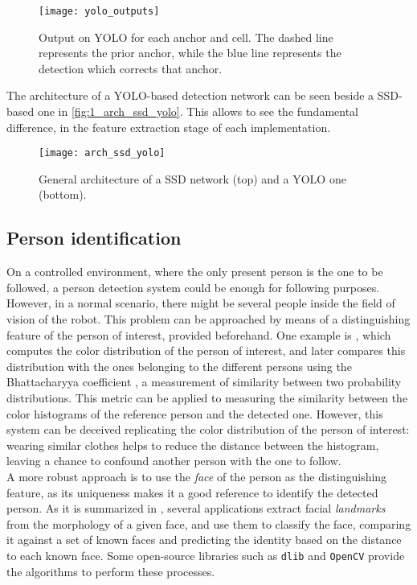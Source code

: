 \begin{figure}[h]
	\centering
	\texttt{[image: yolo\_outputs]}
	\caption{Output on YOLO for each anchor and cell. The dashed line represents the prior anchor, while the blue line represents the detection which corrects that anchor.}
	\label{fig:1_yolo_output}
\end{figure}


The architecture of a YOLO-based detection network can be seen beside a SSD-based one in \autoref{fig:1_arch_ssd_yolo}. This allows to see the fundamental difference, in the feature extraction stage of each implementation.

\begin{figure}[h]
	\centering
	\texttt{[image: arch\_ssd\_yolo]}
	\caption{General architecture of a SSD network (top) and a YOLO one (bottom).}
	\label{fig:1_arch_ssd_yolo}
\end{figure}


\subsection{Person identification}
On a controlled environment, where the only present person is the one to be followed, a person detection system could be enough for following purposes. However, in a normal scenario, there might be several people inside the field of vision of the robot. This problem can be approached by means of a distinguishing feature of the person of interest, provided beforehand. One example is \cite{color_id}, which computes the color distribution of the person of interest, and later compares this distribution with the ones belonging to the different persons using the Bhattacharyya coefficient \cite{bhattacharyya}, a measurement of similarity between two probability distributions. This metric can be applied to measuring the similarity between the color histograms of the reference person and the detected one. However, this system can be deceived replicating the color distribution of the person of interest: wearing similar clothes helps to reduce the distance between the histogram, leaving a chance to confound another person with the one to follow.\\

A more robust approach is to use the \textit{face} of the person as the distinguishing feature, as its uniqueness makes it a good reference to identify the detected person. As it is summarized in \cite{dlib_review}, several applications extract facial \textit{landmarks} from the morphology of a given face, and use them to classify the face, comparing it against a set of known faces and predicting the identity based on the distance to each known face. Some open-source libraries such as \texttt{dlib} and \texttt{OpenCV} provide the algorithms to perform these processes.\\

